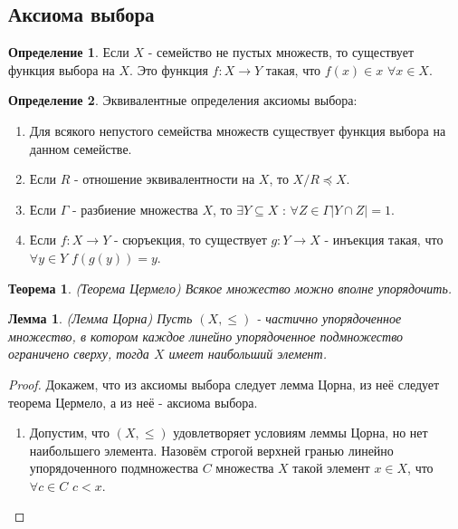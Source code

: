 \documentclass[a4paper, 12pt]{article}
\theoremstyle{definition}
\newtheorem*{definition}{Определение}
\theoremstyle{plain}
\newtheorem*{theorem}{Теорема}
\newtheorem*{lemma}{Лемма}
\theoremstyle{remark}
\begin{document}
  \subsection{Аксиома выбора}
  \begin{definition}
    Если $X$ - семейство не пустых множеств, то существует функция выбора на $X$. Это функция $f:X\to Y$ такая, что $f(x)\in x$ $\forall x\in X$.
  \end{definition}
  \begin{definition}
    Эквивалентные определения аксиомы выбора:
    \begin{enumerate}
      \item Для всякого непустого семейства множеств существует функция выбора на данном семействе.
      \item Если $R$ - отношение эквивалентности на $X$, то $X/R\preceq X$.
      \item Если $\Gamma$ - разбиение множества $X$, то $\exists Y\subseteq X$ : $\forall Z\in\Gamma|Y\cap Z|=1$.
      \item Если $f:X\to Y$ - сюръекция, то существует $g:Y\to X$ - инъекция такая, что $\forall y\in Y$ $f(g(y))=y$.
    \end{enumerate}
  \end{definition}
  \begin{theorem}(Теорема Цермело)
    Всякое множество можно вполне упорядочить.
  \end{theorem}
  \begin{lemma}(Лемма Цорна)
    Пусть $(X,\leqslant)$ - частично упорядоченное множество, в котором каждое линейно упорядоченное подмножество ограничено сверху, тогда $X$ имеет наибольший элемент.
  \end{lemma}
  \begin{proof}
    Докажем, что из аксиомы выбора следует лемма Цорна, из неё следует теорема Цермело, а из неё - аксиома выбора.
    \begin{enumerate}
      \item Допустим, что $(X,\leqslant)$ удовлетворяет условиям леммы Цорна, но нет наибольшего элемента. Назовём строгой верхней гранью линейно упорядоченного подмножества $C$ множества $X$ такой элемент $x\in X$, что $\forall c\in C$ $c<x$.
    \end{enumerate}
  \end{proof}
\end{document}
